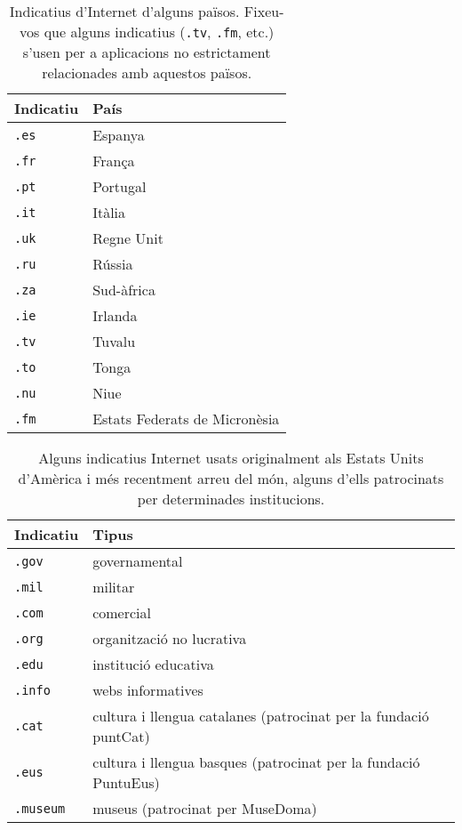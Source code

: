\begin{table}
\begin{center}
\begin{tabular}{l|l}
\hline\hline
{\sc Indicatiu} & {\sc País} \\\hline
{\tt .es} & Espanya \\
{\tt .fr} & França \\
{\tt .pt} & Portugal \\
{\tt .it} & Itàlia \\
{\tt .uk} & Regne Unit \\
{\tt .ru} & Rússia \\
{\tt .za} & Sud-àfrica \\
{\tt .ie} & Irlanda \\
{\tt .tv} & Tuvalu \\
{\tt .to} & Tonga \\
{\tt .nu} & Niue \\
{\tt .fm} & Estats Federats de Micronèsia \\
\hline
\end{tabular}
\end{center}
\caption{Indicatius d'Internet d'alguns països. Fixeu-vos que
  alguns indicatius (\texttt{.tv}, \texttt{.fm}, etc.) s'usen per a
  aplicacions no estrictament relacionades amb aquestos països.}
\label{tb:pais}
\end{table}

\begin{table}
\begin{center}
\begin{tabular}{l|l}
\hline\hline
{\sc Indicatiu} & {\sc Tipus} \\\hline
{\tt .gov} & governamental \\
{\tt .mil} & militar \\
{\tt .com} & comercial \\
{\tt .org} & organització no lucrativa \\
{\tt .edu} & institució educativa \\
{\tt .info} & webs informatives \\
{\tt .cat} & cultura i llengua catalanes (patrocinat per la fundació puntCat) \\
{\tt .eus} & cultura i llengua basques (patrocinat per la fundació PuntuEus) \\
{\tt .museum} & museus (patrocinat per MuseDoma) \\
\hline\end{tabular}
\end{center}
\caption{Alguns indicatius Internet usats originalment als Estats
  Units d'Amèrica i més recentment arreu del
  món, alguns d'ells patrocinats per determinades institucions.}
\label{tb:tipus}
\end{table}

